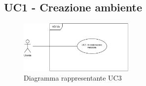 \subsection{UC1 - Creazione ambiente}
\label{sub:uc2}

\begin{figure}[h]
    \centering
    \includegraphics[width=0.5\textwidth]{componenti/casi-duso/diagrammi/UC2.pdf}
    \caption{Diagramma rappresentante UC3}
    \label{fig:UC2}
\end{figure}


